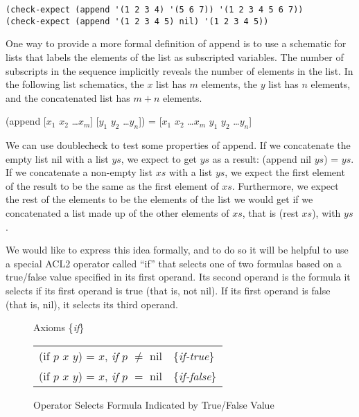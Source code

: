\begin{Verbatim}
(check-expect (append '(1 2 3 4) '(5 6 7)) '(1 2 3 4 5 6 7))
(check-expect (append '(1 2 3 4 5) nil) '(1 2 3 4 5))
\end{Verbatim}

One way to provide a more formal definition of append is
to use a schematic for lists
that labels the elements of the list as subscripted variables.
The number of subscripts in the sequence implicitly reveals the number of elements in the list.
\label{list-schematic} In the following list schematics,
the $x$ list has $m$ elements, the $y$ list has $n$ elements,
and the concatenated list has $m+n$ elements.
\begin{samepage}
\begin{center}
(append [$x_1$ $x_2$ \dots $x_m$] [$y_1$ $y_2$ \dots $y_n$]) = [$x_1$ $x_2$ \dots $x_m$ $y_1$ $y_2$ \dots $y_n$]
\end{center}
\end{samepage}

We can use doublecheck to test some properties of append.
If we concatenate the empty list nil with a list $ys$,
we expect to get $ys$ as a result: (append nil $ys$) = $ys$.
If we concatenate a non-empty list $xs$ with a list $ys$,
we expect the first element of the result to be the same as
the first element of $xs$.
Furthermore, we expect the rest of the elements to be
the elements of the list we would get if we concatenated
a list made up of the other elements of $xs$, that is (rest $xs$),
with $ys$.

We would like to express this idea formally,
and to do so it will be helpful to use a special ACL2 operator
called ``if''
that selects one of two formulas based on a true/false
value specified in its first operand.
Its second operand is the formula it selects if
its first operand is true (that is, not nil).
If its first operand is false (that is, nil),
it selects its third operand.

\begin{figure}
\begin{center}
Axioms \{\emph{if}\} \\
\begin{tabular}{ll}
(if $p$ $x$ $y$) = $x$, \emph{if} $p$ $\neq$ nil  & \{\emph{if-true}\}  \\
(if $p$ $x$ $y$) = $x$, \emph{if} $p$ $=$ nil     & \{\emph{if-false}\} \\
\end{tabular}
\end{center}
\caption{Operator Selects Formula Indicated by True/False Value}
\label{fig:if-axioms}
\end{figure}

